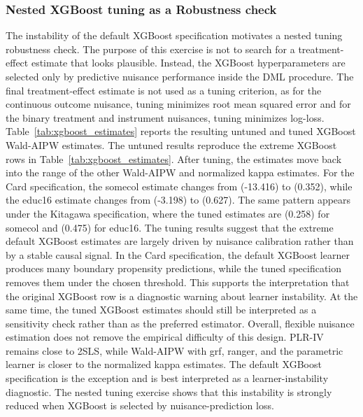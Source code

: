 \documentclass[12pt, a4paper, oneside]{article}
\theoremstyle{plain}
\theoremstyle{definition}
\begin{document}
\subsubsection{Nested XGBoost tuning as a Robustness check}
The instability of the default XGBoost specification motivates a nested tuning robustness check. The purpose of this exercise is not to search for a treatment-effect estimate that looks plausible.
Instead, the XGBoost hyperparameters are selected only by predictive nuisance performance inside the DML procedure.
The final treatment-effect estimate is not used as a tuning criterion, as for the continuous outcome nuisance, tuning minimizes root mean squared error and for the binary treatment and instrument nuisances, tuning minimizes log-loss.
Table~\ref{tab:xgboost_estimates} reports the resulting untuned and tuned XGBoost Wald-AIPW estimates. The untuned results reproduce the extreme XGBoost rows in Table~\ref{tab:xgboost_estimates}. After tuning, the estimates move back into the range of the other Wald-AIPW and normalized kappa estimates. For the Card specification, the somecol estimate changes from (-13.416) to (0.352), while the educ16 estimate changes from (-3.198) to (0.627). The same pattern appears under the Kitagawa specification, where the tuned estimates are (0.258) for somecol and (0.475) for educ16.
The tuning results suggest that the extreme default XGBoost estimates are largely driven by nuisance calibration rather than by a stable causal signal. In the Card specification, the default XGBoost learner produces many boundary propensity predictions, while the tuned specification removes them under the chosen threshold. This supports the interpretation that the original XGBoost row is a diagnostic warning about learner instability. At the same time, the tuned XGBoost estimates should still be interpreted as a sensitivity check rather than as the preferred estimator.
Overall, flexible nuisance estimation does not remove the empirical difficulty of this design. PLR-IV remains close to 2SLS, while Wald-AIPW with grf, ranger, and the parametric learner is closer to the normalized kappa estimates. The default XGBoost specification is the exception and is best interpreted as a learner-instability diagnostic. The nested tuning exercise shows that this instability is strongly reduced when XGBoost is selected by nuisance-prediction loss.
\end{document}
